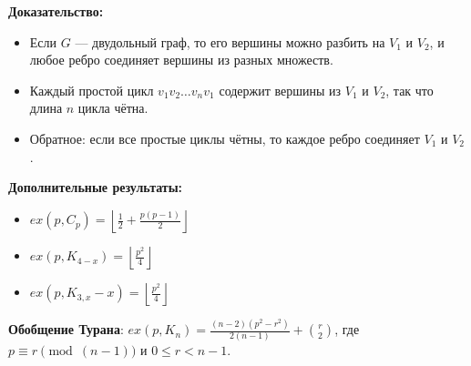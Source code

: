 \noindent\textbf{Доказательство:}
\begin{itemize}[noitemsep]
    \item Если $G$ — двудольный граф, то его вершины можно разбить на $V_1$ и $V_2$, и любое ребро соединяет вершины из разных множеств.
    \item Каждый простой цикл $v_1v_2\ldots v_nv_1$ содержит вершины из $V_1$ и $V_2$, так что длина $n$ цикла чётна.
    \item Обратное: если все простые циклы чётны, то каждое ребро соединяет $V_1$ и $V_2$.
\end{itemize}

\noindent\textbf{Дополнительные результаты:}
\begin{itemize}[noitemsep]
    \item $ex(p, C_p) = \left\lfloor \frac{1}{2} + \frac{p(p-1)}{2} \right\rfloor$
    \item $ex(p, K_{4-x}) = \left\lfloor \frac{p^2}{4} \right\rfloor$
    \item $ex(p, K_{3, x} - x) = \left\lfloor \frac{p^2}{4} \right\rfloor$
\end{itemize}

\noindent\textbf{Обобщение Турана}: $ex(p, K_n) = \frac{(n-2)(p^2 - r^2)}{2(n-1)} + \binom{r}{2}$, где $p \equiv r \pmod{(n-1)}$ и $0 \leq r < n-1$.